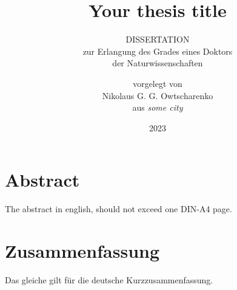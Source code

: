 \documentclass[a4paper, twoside, english, 11pt, DIV=12, BCOR=1cm, headsepline, listof=totoc, bibliography=totoc]{scrbook}
\author{vorgelegt von \\ Nikolaus G. G. Owtscharenko\\
aus \textit{some city} \vspace{30mm} \\ \handInInstitute}
\title{Your thesis title\\}
\subtitle{\vspace{20mm} DISSERTATION \\
	zur Erlangung des Grades eines Doktors \\
	der Naturwissenschaften \\
	\vspace{15mm}
}
\date{2023}
\newcommand{\thesisabstract}{
The abstract in english, should not exceed one DIN-A4 page.
}
\newcommand{\thesisabstractGerman}{
Das gleiche gilt für die deutsche Kurzzusammenfassung.
}
\begin{document}
\frontmatter
\renewcommand{\glsnamefont}[1]{\textbf{#1}}
%
\maketitle  %

\lowertitleback{
  Betreuer und erster Gutachter: Prof. John Doe\\
  Zweiter Gutachter: Prof. Jane Doe\\
  Tag der mündlichen Prüfung: XX.XX.XXXX}
\maketitle %
\section*{Abstract}
\thesisabstract
\newpage
\section*{Zusammenfassung}
\thesisabstractGerman


\let\backupskip\chapterheadstartvskip
\renewcommand*\chapterheadstartvskip{\vspace*{-\topskip}}
\tableofcontents
\let\chapterheadstartvskip\backupskip

\newpage
\mainmatter




\setlength\LTleft{-5pt}
\printglossary[title={Abbreviations}]
\printbibliography


\end{document}
